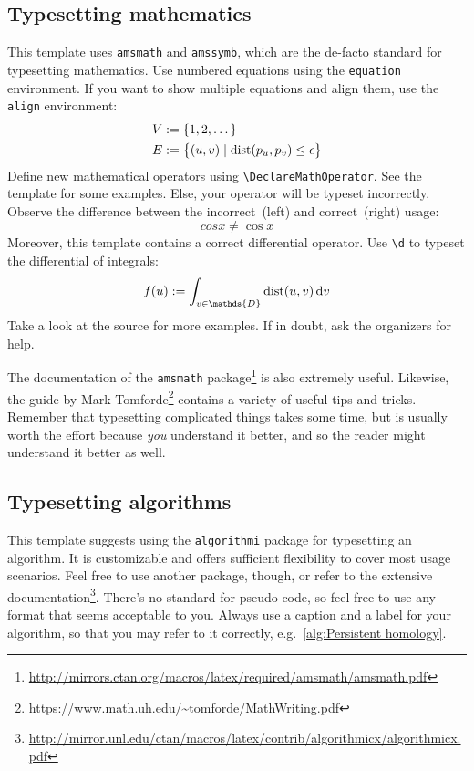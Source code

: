 \subsection{Typesetting mathematics}

This template uses \verb|amsmath| and \verb|amssymb|, which are the
de-facto standard for typesetting mathematics. Use numbered equations
using the \verb|equation| environment.
%
If you want to show multiple equations and align them, use the
\verb|align| environment:
%
\begin{align}
    V &:= \{ 1, 2, \dots \}\\
    E &:= \big\{ \left(u,v\right) \mid \dist\left(p_u, p_v\right) \leq \epsilon \big\}
\end{align}
%
Define new mathematical operators using \verb|\DeclareMathOperator|. See
the template for some examples. Else, your operator will be typeset
incorrectly. Observe the difference between the incorrect~(left) and
correct~(right) usage: 
%
\begin{equation}
  cos x \neq \cos x
\end{equation}
%
Moreover, this template contains a correct differential operator. Use \verb|\d| to typeset the differential of integrals:
%
\begin{equation}
  f(u) := \int_{v \in \mathds{D}}\dist(u,v)\d{v}
\end{equation}
%
Take a look at the source for more examples. If in doubt, ask the
organizers for help.

The documentation of the \verb|amsmath|
package\footnote{\url{http://mirrors.ctan.org/macros/latex/required/amsmath/amsmath.pdf}}
is also extremely useful.
%
Likewise, the guide by Mark
Tomforde\footnote{\url{https://www.math.uh.edu/~tomforde/MathWriting.pdf}}
contains a variety of useful tips and tricks.
%
Remember that typesetting complicated things takes some time, but is
usually worth the effort because \emph{you} understand it better, and so
the reader might understand it better as well.

\subsection{Typesetting algorithms}

This template suggests using the \verb|algorithmi| package for
typesetting an algorithm.
%
It is customizable and offers sufficient flexibility to cover most usage scenarios. Feel free to use another package, though, or refer to the extensive documentation\footnote{\url{http://mirror.unl.edu/ctan/macros/latex/contrib/algorithmicx/algorithmicx.pdf}}.
%
There's no standard for pseudo-code, so feel free to use any format that
seems acceptable to you. Always use a caption and a label for your algorithm, so that you may refer to it correctly, e.g.\ \autoref{alg:Persistent homology}.

